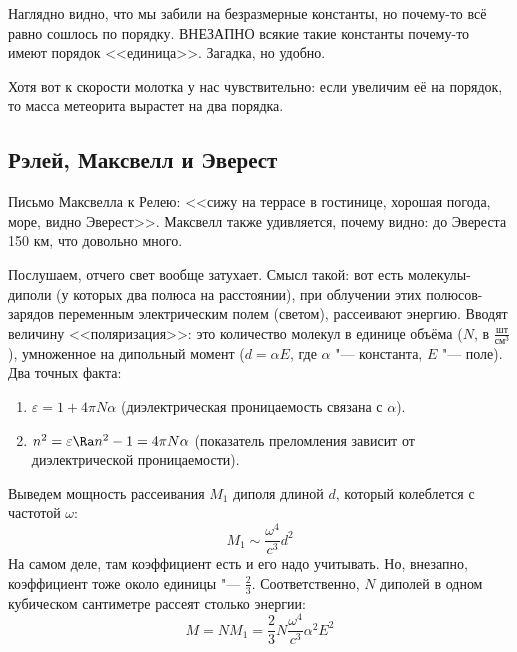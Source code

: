 Наглядно видно, что мы забили на безразмерные константы, но почему-то всё равно сошлось по порядку.
ВНЕЗАПНО всякие такие константы почему-то имеют порядок <<единица>>.
Загадка, но удобно.

Хотя вот к скорости молотка у нас чувствительно: если увеличим её на порядок, то масса метеорита вырастет на два порядка.

\subsection{Рэлей, Максвелл и Эверест}
Письмо Максвелла к Релею: <<сижу на террасе в гостинице, хорошая погода, море, видно Эверест>>.
Максвелл также удивляется, почему видно: до Эвереста 150 км, что довольно много.

Послушаем, отчего свет вообще затухает.
Смысл такой: вот есть молекулы-диполи (у которых два полюса на расстоянии), при облучении этих полюсов-зарядов переменным электрическим полем (светом), рассеивают энергию.
Вводят величину <<поляризация>>: это количество молекул в единице объёма ($N$, в $\frac{шт}{см^3}$), умноженное на дипольный момент ($d=\alpha E$, где $\alpha$ "--- константа, $E$ "--- поле).
Два точных факта:
\begin{enumerate}
\item $\varepsilon = 1 + 4\pi N \alpha$ (диэлектрическая проницаемость связана с $\alpha$).
\item $n^2 = \varepsilon \Ra n^2 - 1 = 4\pi N \alpha$ (показатель преломления зависит от диэлектрической проницаемости).
\end{enumerate}
Выведем мощность рассеивания $M_1$ диполя длиной $d$, который колеблется с частотой $\omega$:
\[ M_1 \sim \frac{\omega^4}{c^3}d^2 \]
На самом деле, там коэффициент есть и его надо учитывать.
Но, внезапно, коэффициент тоже около единицы "--- $\frac 23$.
Соответственно, $N$ диполей в одном кубическом сантиметре рассеят столько энергии:
\[ M=NM_1 = \frac 23 N \frac{\omega^4}{c^3} \alpha^2 E^2 \]

